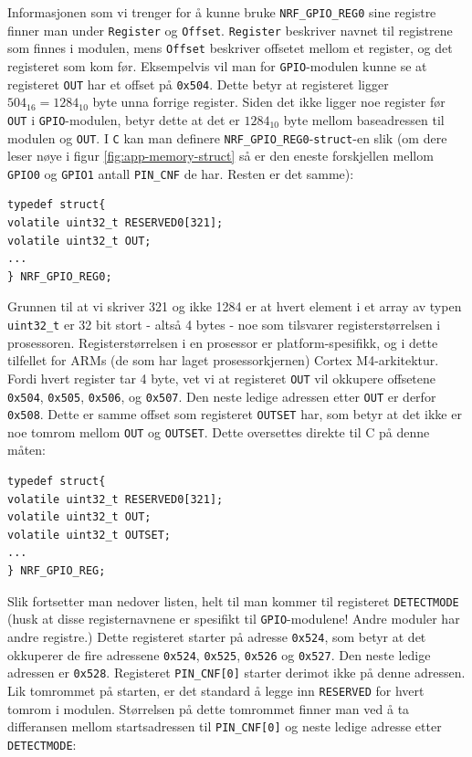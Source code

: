 Informasjonen som vi trenger for å kunne bruke \verb|NRF_GPIO_REG0| sine registre finner man under \verb|Register| og \verb|Offset|. \verb|Register| beskriver navnet til registrene som finnes i modulen, mens \verb|Offset| beskriver offsetet mellom et register, og det registeret som kom før. Eksempelvis vil man for \verb|GPIO|-modulen kunne se at registeret \verb|OUT| har et offset på \verb|0x504|. Dette betyr at registeret ligger $504_{16} = 1284_{10}$ byte unna forrige register. Siden det ikke ligger noe register før \verb|OUT| i \verb|GPIO|-modulen, betyr dette at det er $1284_{10}$ byte mellom baseadressen til modulen og \verb|OUT|. I \verb|C| kan man definere \verb|NRF_GPIO_REG0|-\verb|struct|-en slik (om dere leser nøye i figur \ref{fig:app-memory-struct} så er den eneste forskjellen mellom \verb|GPIO0| og \verb|GPIO1| antall \verb|PIN_CNF| de har. Resten er det samme):

\newpage
\begin{lstlisting}
typedef struct{
volatile uint32_t RESERVED0[321];
volatile uint32_t OUT;
...
} NRF_GPIO_REG0;
\end{lstlisting}

Grunnen til at vi skriver 321 og ikke 1284 er at hvert element i et array av typen \verb|uint32_t| er 32 bit stort - altså 4 bytes - noe som tilsvarer registerstørrelsen i prosessoren. Registerstørrelsen i en prosessor er platform-spesifikk, og i dette tilfellet for ARMs  (de som har laget prosessorkjernen) Cortex M4-arkitektur. Fordi hvert register tar 4 byte, vet vi at registeret \verb|OUT| vil okkupere offsetene \verb|0x504|, \verb|0x505|, \verb|0x506|, og \verb|0x507|. Den neste ledige adressen etter \verb|OUT| er derfor \verb|0x508|. Dette er samme offset som registeret \verb|OUTSET| har, som betyr at det ikke er noe tomrom mellom \verb|OUT| og \verb|OUTSET|. Dette oversettes direkte til C på denne måten:

\begin{lstlisting}
typedef struct{
volatile uint32_t RESERVED0[321];
volatile uint32_t OUT;
volatile uint32_t OUTSET;
...
} NRF_GPIO_REG;
\end{lstlisting}

Slik fortsetter man nedover listen, helt til man kommer til registeret \verb|DETECTMODE| (husk at disse registernavnene er spesifikt til \verb|GPIO|-modulene! Andre moduler har andre registre.) Dette registeret starter på adresse \verb|0x524|, som betyr at det okkuperer de fire adressene \verb|0x524|, \verb|0x525|, \verb|0x526| og \verb|0x527|. Den neste ledige adressen er \verb|0x528|. Registeret \verb|PIN_CNF[0]| starter derimot ikke på denne adressen. Lik tomrommet på starten, er det standard å legge inn \verb|RESERVED| for hvert tomrom i modulen. Størrelsen på dette tomrommet finner man ved å ta differansen mellom startsadressen til \verb|PIN_CNF[0]| og neste ledige adresse etter \verb|DETECTMODE|:

